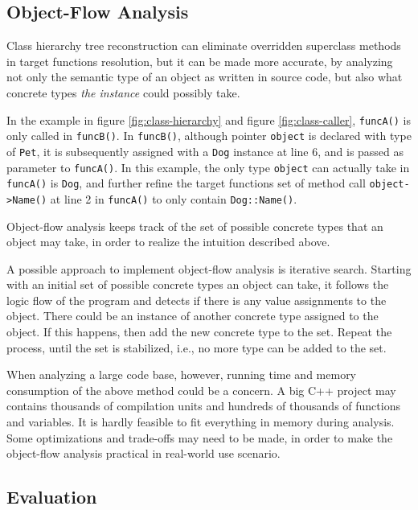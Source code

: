 \documentclass[12pt]{article}
\begin{document}
\subsection{Object-Flow Analysis}
\label{subsection:object-flow}

Class hierarchy tree reconstruction can eliminate overridden superclass methods in target functions resolution, but it can be made more accurate, by analyzing not only the semantic type of an object as written in source code, but also what concrete types \textit{the instance} could possibly take.

In the example in figure \ref{fig:class-hierarchy} and figure \ref{fig:class-caller}, \texttt{funcA()} is only called in \texttt{funcB()}. In \texttt{funcB()}, although pointer \texttt{object} is declared with type of \texttt{Pet}, it is subsequently assigned with a \texttt{Dog} instance at line 6, and is passed as parameter to \texttt{funcA()}. In this example, the only type \texttt{object} can actually take in \texttt{funcA()} is \texttt{Dog}, and further refine the target functions set of method call \texttt{object->Name()} at line 2 in \texttt{funcA()} to only contain \texttt{Dog::Name()}.

Object-flow analysis keeps track of the set of possible concrete types that an object may take, in order to realize the intuition described above.

A possible approach to implement object-flow analysis is iterative search. Starting with an initial set of possible concrete types an object can take, it follows the logic flow of the program and detects if there is any value assignments to the object. There could be an instance of another concrete type assigned to the object. If this happens, then add the new concrete type to the set. Repeat the process, until the set is stabilized, i.e., no more type can be added to the set.

When analyzing a large code base, however, running time and memory consumption of the above method could be a concern. A big C++ project may contains thousands of compilation units and hundreds of thousands of functions and variables. It is hardly feasible to fit everything in memory during analysis. Some optimizations and trade-offs may need to be made, in order to make the object-flow analysis practical in real-world use scenario.

\subsection{Evaluation}
\label{subsection:evaluation}
\end{document}
